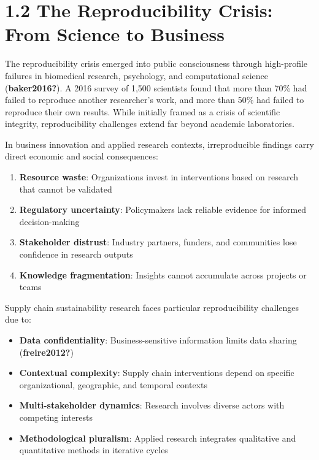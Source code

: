 \documentclass[
  oneside,
  open=any]{scrbook}
\providecommand{\tightlist}{%
  \setlength{\itemsep}{0pt}\setlength{\parskip}{0pt}}\usepackage{longtable,booktabs,array}
\begin{document}
\section{1.2 The Reproducibility Crisis: From Science to
Business}\label{the-reproducibility-crisis-from-science-to-business}

The reproducibility crisis emerged into public consciousness through
high-profile failures in biomedical research, psychology, and
computational science (\textbf{baker2016?}). A 2016 survey of 1,500
scientists found that more than 70\% had failed to reproduce another
researcher's work, and more than 50\% had failed to reproduce their own
results. While initially framed as a crisis of scientific integrity,
reproducibility challenges extend far beyond academic laboratories.

In business innovation and applied research contexts, irreproducible
findings carry direct economic and social consequences:

\begin{enumerate}
\def\labelenumi{\arabic{enumi}.}
\tightlist
\item
  \textbf{Resource waste}: Organizations invest in interventions based
  on research that cannot be validated
\item
  \textbf{Regulatory uncertainty}: Policymakers lack reliable evidence
  for informed decision-making
\item
  \textbf{Stakeholder distrust}: Industry partners, funders, and
  communities lose confidence in research outputs
\item
  \textbf{Knowledge fragmentation}: Insights cannot accumulate across
  projects or teams
\end{enumerate}

Supply chain sustainability research faces particular reproducibility
challenges due to:

\begin{itemize}
\tightlist
\item
  \textbf{Data confidentiality}: Business-sensitive information limits
  data sharing (\textbf{freire2012?})
\item
  \textbf{Contextual complexity}: Supply chain interventions depend on
  specific organizational, geographic, and temporal contexts
\item
  \textbf{Multi-stakeholder dynamics}: Research involves diverse actors
  with competing interests
\item
  \textbf{Methodological pluralism}: Applied research integrates
  qualitative and quantitative methods in iterative cycles
\end{itemize}
\end{document}
